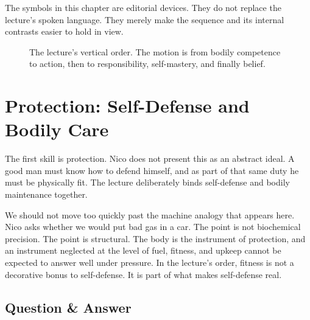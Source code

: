 \begin{remark}
The symbols in this chapter are editorial devices. They do not replace the lecture's spoken language. They merely make the sequence and its internal contrasts easier to hold in view.
\end{remark}

\begin{figure}[h]
\centering
{}
\caption{The lecture's vertical order. The motion is from bodily competence to action, then to responsibility, self-mastery, and finally belief.}
\end{figure}

\section{Protection: Self-Defense and Bodily Care}

The first skill is protection. Nico does not present this as an abstract ideal. A good man must know how to defend himself, and as part of that same duty he must be physically fit. The lecture deliberately binds self-defense and bodily maintenance together.

We should not move too quickly past the machine analogy that appears here. Nico asks whether we would put bad gas in a car. The point is not biochemical precision. The point is structural. The body is the instrument of protection, and an instrument neglected at the level of fuel, fitness, and upkeep cannot be expected to answer well under pressure. In the lecture's order, fitness is not a decorative bonus to self-defense. It is part of what makes self-defense real.

\subsection{Question \& Answer}

